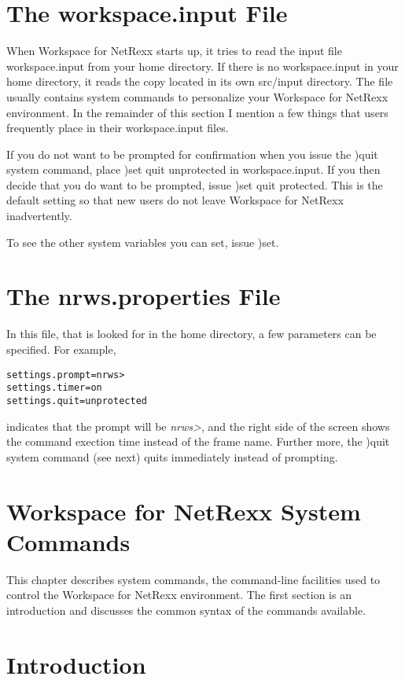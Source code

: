 \section{The workspace.input File}

When Workspace for NetRexx starts up, it tries to read the input file workspace.input from your home directory. If there is no workspace.input in your home directory, it reads the copy located in its own src/input directory. The file usually contains system commands to personalize your Workspace for NetRexx environment. In the remainder of this section I mention a few things that users frequently place in their workspace.input files.

If you do not want to be prompted for confirmation when you issue the )quit system command, place )set quit unprotected in workspace.input. If you then decide that you do want to be prompted, issue )set quit protected. This is the default setting so that new users do not leave Workspace for NetRexx inadvertently.

To see the other system variables you can set, issue )set.


\section{The nrws.properties File}

In this file, that is looked for in the home directory, a few
parameters can be specified. For example,
\begin{verbatim}
settings.prompt=nrws>
settings.timer=on
settings.quit=unprotected
\end{verbatim}
indicates that the prompt will be \emph{nrws>}, and the right side of
the screen shows the command exection time instead of the frame
name. Further more, the )quit system command (see next) quits
immediately instead of prompting.

\section{Workspace for NetRexx System Commands}

This chapter describes system commands, the command-line facilities used to control the Workspace for NetRexx environment. The first section is an introduction and discusses the common syntax of the commands available.

\section{Introduction}

